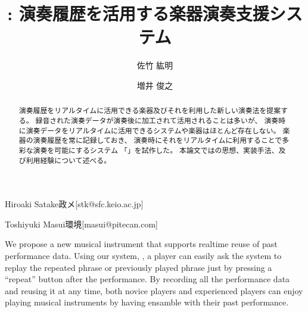\documentclass[submit,techreq]{ec2017}
\begin{document}
\title{{\system}: 演奏履歴を活用する楽器演奏支援システム}


  
\author{佐竹 紘明}{Hiroaki Satake}{政メ}[stk@sfc.keio.ac.jp]
\author{増井 俊之}{Toshiyuki Masui}{環境}[masui@pitecan.com]

\begin{abstract} %
  
演奏履歴をリアルタイムに活用できる楽器及びそれを利用した新しい演奏法を提案する。
%
録音された演奏データが演奏後に加工されて活用されることは多いが、
演奏時に演奏データをリアルタイムに活用できるシステムや楽器はほとんど存在しない。
%
 楽器の演奏履歴を常に記録しておき、
演奏時にそれをリアルタイムに利用することで多彩な演奏を可能にするシステム
「{\system}」を試作した。
%
本論文では{\system}の思想、実装手法、及び利用経験について述べる。
  
\end{abstract}


\begin{eabstract}

We propose a new musical instrument that supports realtime reuse of
past performance data.
%
Using our system, \textit{\system},
a player can easily ask the system to replay the repeated phrase or
previously played phrase just by pressing a ``repeat'' button after the performance.
%
By recording all the performance data and reusing it at any time,
both novice players and experienced players can enjoy playing musical instruments
by having ensamble with their past performance.
  
\end{eabstract}


\maketitle










\end{document}
